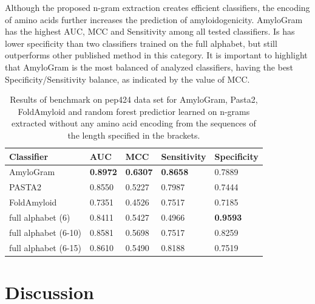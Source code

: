 \documentclass{bioinfo}
\begin{document}
  Although the proposed n-gram extraction creates efficient classifiers, the 
encoding of amino acids further increases the prediction of amyloidogenicity. 
AmyloGram has the highest AUC, MCC and Sensitivity among all tested classifiers. 
Is has lower specificity than two classifiers trained on the full alphabet, but 
still outperforms other published method in this category. It is important to 
highlight that AmyloGram is the most balanced of analyzed classifiers, having 
the best Specificity/Sensitivity balance, as indicated by the value of MCC.

\begin{table}[ht]
\centering
\caption{Results of benchmark on pep424 data set for AmyloGram, Pasta2, FoldAmyloid and 
               random forest predictior learned on n-grams extracted without any amino acid 
               encoding from the sequences of the length specified in the brackets.} 
\label{tab:bench_summary}
\begin{tabular}{lllll}
  \toprule
Classifier & AUC & MCC & Sensitivity & Specificity \\ 
  \midrule
AmyloGram & \textbf{0.8972} & \textbf{0.6307} & \textbf{0.8658} & 0.7889 \\ 
   \rowcolor[gray]{0.85}PASTA2 & 0.8550 & 0.5227 & 0.7987 & 0.7444 \\ 
  FoldAmyloid & 0.7351 & 0.4526 & 0.7517 & 0.7185 \\ 
   \rowcolor[gray]{0.85}full alphabet (6) & 0.8411 & 0.5427 & 0.4966 & \textbf{0.9593} \\ 
  full alphabet (6-10) & 0.8581 & 0.5698 & 0.7517 & 0.8259 \\ 
   \rowcolor[gray]{0.85}full alphabet (6-15) & 0.8610 & 0.5490 & 0.8188 & 0.7519 \\ 
   \bottomrule
\end{tabular}
\end{table}

\section{Discussion}









%
%
\end{document}
